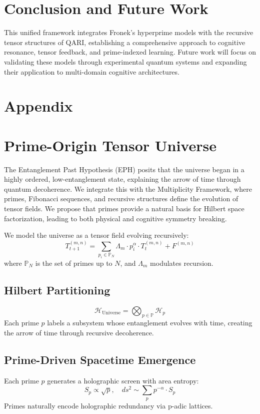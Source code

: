 \documentclass[12pt]{article}
\begin{document}
\section{Conclusion and Future Work}
This unified framework integrates Fronek’s hyperprime models with the recursive tensor structures of QARI, establishing a comprehensive approach to cognitive resonance, tensor feedback, and prime-indexed learning. Future work will focus on validating these models through experimental quantum systems and expanding their application to multi-domain cognitive architectures.

\section*{Appendix}
\appendix
\section{Prime-Origin Tensor Universe}
The Entanglement Past Hypothesis (EPH) posits that the universe began in a highly ordered, low-entanglement state, explaining the arrow of time through quantum decoherence. We integrate this with the Multiplicity Framework, where primes, Fibonacci sequences, and recursive structures define the evolution of tensor fields. We propose that primes provide a natural basis for Hilbert space factorization, leading to both physical and cognitive symmetry breaking.

We model the universe as a tensor field evolving recursively:
\begin{equation}
T_{t+1}^{(m,n)} = \sum_{p_i \in \mathbb{P}_N} \Lambda_m \cdot p_i^\alpha \cdot T_t^{(m,n)} + F^{(m,n)}
\end{equation}
where $\mathbb{P}_N$ is the set of primes up to $N$, and $\Lambda_m$ modulates recursion.

\subsection{Hilbert Partitioning}
\begin{equation}
\mathcal{H}_\text{Universe} = \bigotimes_{p \in \mathbb{P}} \mathcal{H}_p
\end{equation}
Each prime $p$ labels a subsystem whose entanglement evolves with time, creating the arrow of time through recursive decoherence.



\subsection{Prime-Driven Spacetime Emergence}
Each prime $p$ generates a holographic screen with area entropy:
\begin{equation}
S_p \propto \sqrt{p}, \quad ds^2 \sim \sum_p p^{-\alpha} \cdot S_p
\end{equation}
Primes naturally encode holographic redundancy via p-adic lattices.
\end{document}
